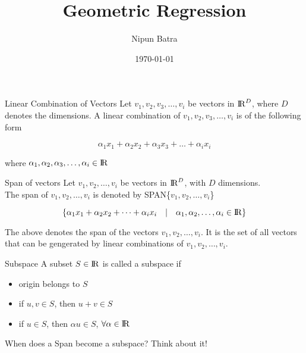 \documentclass{beamer}
\title{Geometric Regression}
\date{\today}
\author{Nipun Batra}
\institute{IIT Gandhinagar}
\begin{document}
	\maketitle
	
	
	\begin{frame}{Linear Combination of Vectors}
		Let $v_{1},v_{2},v_{3},\dots,v_{i}$ be vectors in  ${\rm I\!R}^{D}$, where $D$ denotes the dimensions. A linear combination of $v_{1},v_{2},v_{3},\dots,v_{i}$ is of the following form
		
		\begin{equation*}
			\alpha_{1}x_{1}+			\alpha_{2}x_{2}+			\alpha_{3}x_{3}+
			\dots+\alpha_{i}x_{i}
		\end{equation*}
		
		where $\alpha_{1},\alpha_{2},\alpha_{3},\dots,\alpha_{i} \in {\rm I\!R}$
		
	\end{frame}

\begin{frame}{Span of vectors}
		Let $v_{1},v_{2},\dots,v_{i}$ be vectors in  ${\rm I\!R}^{D}$, with $D$ dimensions. \\
		The span of  $v_{1},v_{2},\dots,v_{i}$ is denoted by SPAN\{$v_{1},v_{2},\dots,v_{i} $\}
		
		\begin{equation*}
	    \{	\alpha_{1}x_{1}+			\alpha_{2}x_{2}+
		\dots+\alpha_{i}x_{i} \hspace{1em}\vert \hspace{1em}  \alpha_{1},\alpha_{2},\dots,\alpha_{i} \in {\rm I\!R}\}
		\end{equation*}
		
		The above denotes the span of the vectors $v_{1},v_{2},\dots,v_{i}$.  It is the set of all vectors that can be gengerated by linear combinations of $v_{1},v_{2},\dots,v_{i}$.
\end{frame}


\begin{frame}{Subspace}
	A subset $S$ $\in {\rm I\!R}$ is called a subspace if  
	\begin{itemize}
		\item origin belongs to $S$
		\item if $u,v \in S$, then $u+v \in S$  
		\item if $u \in S$, then $\alpha u \in S$,  $\forall \alpha \in {\rm I\!R}$
	\end{itemize}	
\end{frame}

\begin{frame}{When does a Span become a subspace?}
	Think about it!
\end{frame}
	
\end{document}
